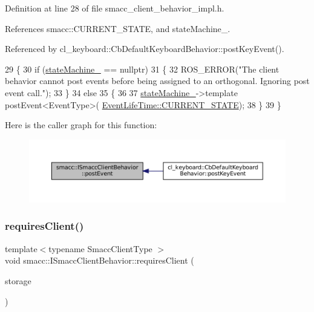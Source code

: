 Definition at line 28 of file smacc\+\_\+client\+\_\+behavior\+\_\+impl.\+h.



References smacc\+::\+C\+U\+R\+R\+E\+N\+T\+\_\+\+S\+T\+A\+TE, and state\+Machine\+\_\+.



Referenced by cl\+\_\+keyboard\+::\+Cb\+Default\+Keyboard\+Behavior\+::post\+Key\+Event().


\begin{DoxyCode}
29 \{
30     \textcolor{keywordflow}{if} (\hyperlink{classsmacc_1_1ISmaccClientBehavior_a0fea65db292a8bb3dfba3e5840491d79}{stateMachine\_} == \textcolor{keyword}{nullptr})
31     \{
32         ROS\_ERROR(\textcolor{stringliteral}{"The client behavior cannot post events before being assigned to an orthogonal. Ignoring
       post event call."});
33     \}
34     \textcolor{keywordflow}{else}
35     \{
36          
37         \hyperlink{classsmacc_1_1ISmaccClientBehavior_a0fea65db292a8bb3dfba3e5840491d79}{stateMachine\_}->template postEvent<EventType>(
      \hyperlink{namespacesmacc_a5063f47926ad2fe25120ed4b1e7b2c7ea49b599d413671f16f08d0dd18243c294}{EventLifeTime::CURRENT\_STATE});
38     \}
39 \}
\end{DoxyCode}
Here is the caller graph for this function\+:
\nopagebreak
\begin{figure}[H]
\begin{center}
\leavevmode
\includegraphics[width=350pt]{classsmacc_1_1ISmaccClientBehavior_a5db577c585935114058770f2b7242f8a_icgraph}
\end{center}
\end{figure}
\mbox{\label{classsmacc_1_1ISmaccClientBehavior_a32b16e99e3b4cb289414203dc861a440}} 
\subsubsection{\texorpdfstring{requires\+Client()}{requiresClient()}}
{\footnotesize\ttfamily template$<$typename Smacc\+Client\+Type $>$ \\
void smacc\+::\+I\+Smacc\+Client\+Behavior\+::requires\+Client (\begin{DoxyParamCaption}\item[{Smacc\+Client\+Type $\ast$\&}]{storage }\end{DoxyParamCaption})}



